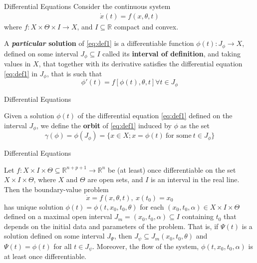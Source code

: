 \documentclass[aspectratio=169, handout]{beamer}
\begin{document}
\begin{frame}{Differential Equations}
    Consider the continuous system \begin{align}\dot{x}(t)=f(x,\theta,t)\label{eq:def1}\end{align} where $f:X\times\Theta\times I\rightarrow X$, and $I\subseteq\mathds{R}$ compact and convex.
    \begin{definition}
        A \textbf{\textit{particular} solution} of \eqref{eq:def1} is a differentiable function $\phi(t):J_{\phi}\rightarrow X$, defined on some interval $J_{\phi}\subseteq I$ called its \textbf{interval of definition}, and taking values in $X$, that together with its derivative satisfies the differential equation \eqref{eq:def1} in $J_\phi$, that is such that \[\phi'(t)=f[\phi(t),\theta,t]\forall t\in J_\phi\]
    \end{definition}
\end{frame}

\begin{frame}{Differential Equations}
    \begin{definition}
        Given a solution $\phi(t)$ of the differential equation \eqref{eq:def1} defined on the interval $J_\phi$, we define the \textbf{orbit} of \eqref{eq:def1} induced by $\phi$ as the set \[\gamma(\phi)=\phi(J_\phi)=\{x\in X; x=\phi(t)\ \text{for some}\ t\in J_\phi\}\]
    \end{definition}
    
\end{frame}

\begin{frame}{Differential Equations}

\begin{theorem}
     Let $f:X\times I\times\Theta\subseteq\mathds{R}^{n+p+1}\rightarrow\mathds{R}^n$ be (at least) once differentiable on the set $X\times I\times \Theta$, where $X$ and $\Theta$ are open sets, and $I$ is an interval in the real line. Then the boundary-value problem \[\dot{x}=f(x,\theta,t),\ x(t_0)=x_0\] has unique solution $\phi(t)=\phi(t,x_0,t_0,\theta)$ for each $(x_0,t_0,\alpha)\in X\times I\times\Theta$ defined on a maximal open interval $J_m=(x_0,t_0,\alpha)\subseteq I$ containing $t_0$ that depends on the initial data and parameters of the problem. That is, if $\Psi(t)$ is a solution defined on some interval $J_\Psi$, then $J_\psi\subseteq J_m(x_0,t_0,\theta)$ and $\Psi(t)=\phi(t)$ for all $t\in J_\psi$. Moreover, the flow of the system, $\phi(t,x_0,t_0,\alpha)$ is at least once differentiable. 
\end{theorem}
    
\end{frame}
\end{document}
